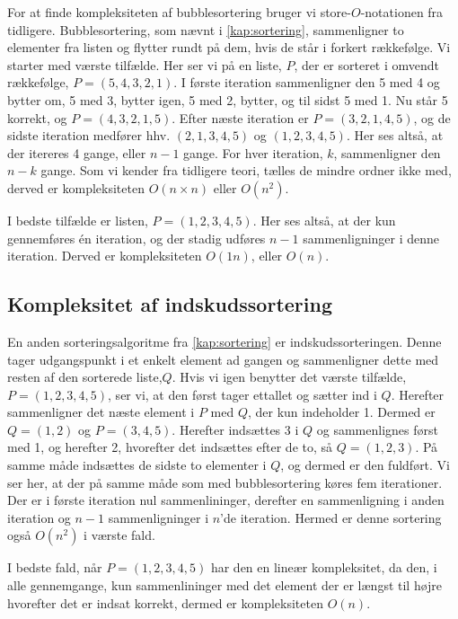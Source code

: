 For at finde kompleksiteten af bubblesortering bruger vi store-$O$-notationen fra tidligere. 
Bubblesortering, som nævnt i \autoref{kap:sortering}, sammenligner to elementer fra listen og flytter rundt på dem, hvis de står i forkert rækkefølge.
Vi starter med værste tilfælde. Her ser vi på en liste, $P$, der er sorteret i omvendt rækkefølge, $P = (5,4,3,2,1)$.
I første iteration sammenligner den 5 med 4 og bytter om, 5 med 3, bytter igen, 5 med 2, bytter, og til sidst 5 med 1. Nu står 5 korrekt, og $P = (4, 3, 2, 1, 5)$.
Efter næste iteration er $P = (3, 2, 1, 4, 5)$, og de sidste iteration medfører hhv. $(2, 1, 3, 4, 5)$ og $(1, 2, 3, 4, 5)$. Her ses altså, at der itereres 4 gange, eller $n-1$ gange. 
For hver iteration, $k$, sammenligner den $n-k$ gange. 
Som vi kender fra tidligere teori, tælles de mindre ordner ikke med, derved er kompleksiteten $O(n\times n)$ eller $O(n^2)$.

I bedste tilfælde er listen, $P = (1, 2, 3, 4, 5)$.
Her ses altså, at der kun gennemføres én iteration, og der stadig udføres $n-1$ sammenligninger i denne iteration. Derved er kompleksiteten $O(1n)$, eller $O(n)$. 

\subsection{Kompleksitet af indskudssortering} \label{kap:kom_indskud}
En anden sorteringsalgoritme fra \autoref{kap:sortering} er indskudssorteringen. 
Denne tager udgangspunkt i et enkelt element ad gangen og sammenligner dette med resten af den sorterede liste,$Q$.
Hvis vi igen benytter det værste tilfælde, $P = (1,2,3,4,5)$, ser vi, at den først tager ettallet og sætter ind i $Q$. Herefter sammenligner det næste element i $P$ med $Q$, der kun indeholder 1. Dermed er $Q=(1,2)$ og $P=(3,4,5)$. 
Herefter indsættes 3 i $Q$ og sammenlignes først med 1, og herefter 2, hvorefter det indsættes efter de to, så $Q = (1,2,3)$. På samme måde indsættes de sidste to elementer i $Q$, og dermed er den fuldført.
Vi ser her, at der på samme måde som med bubblesortering køres fem iterationer. Der er i første iteration nul sammenlininger, derefter en sammenligning i anden iteration og $n-1$ sammenligninger i $n$'de iteration. Hermed er denne sortering også $O(n^2)$ i værste fald.

I bedste fald, når $P= (1,2,3,4,5)$ har den en lineær kompleksitet, da den, i alle gennemgange, kun sammenlininger med det element der er længst til højre hvorefter det er indsat korrekt, dermed er kompleksiteten $O(n)$.






